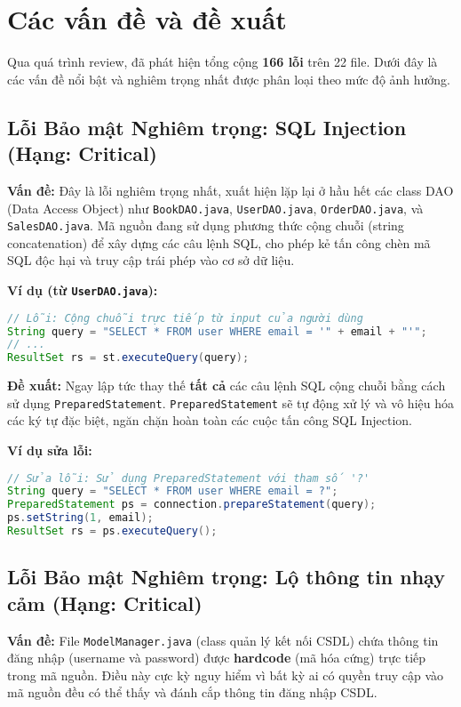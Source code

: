 \chapter{Các vấn đề và đề xuất}
Qua quá trình review, đã phát hiện tổng cộng \textbf{166 lỗi} trên 22 file. Dưới đây là các vấn đề nổi bật và nghiêm trọng nhất được phân loại theo mức độ ảnh hưởng.

\section{Lỗi Bảo mật Nghiêm trọng: SQL Injection (Hạng: Critical)}
\textbf{Vấn đề:} Đây là lỗi nghiêm trọng nhất, xuất hiện lặp lại ở hầu hết các class DAO (Data Access Object) như \texttt{BookDAO.java}, \texttt{UserDAO.java}, \texttt{OrderDAO.java}, và \texttt{SalesDAO.java}. Mã nguồn đang sử dụng phương thức cộng chuỗi (string concatenation) để xây dựng các câu lệnh SQL, cho phép kẻ tấn công chèn mã SQL độc hại và truy cập trái phép vào cơ sở dữ liệu.

\textbf{Ví dụ (từ \texttt{UserDAO.java}):}
\begin{lstlisting}[language=Java, caption={Lỗ hổng SQL Injection trong UserDAO.java (Line 25)}, firstnumber=25]
// Lỗi: Cộng chuỗi trực tiếp từ input của người dùng
String query = "SELECT * FROM user WHERE email = '" + email + "'";
// ...
ResultSet rs = st.executeQuery(query);
\end{lstlisting}

\textbf{Đề xuất:} Ngay lập tức thay thế \textbf{tất cả} các câu lệnh SQL cộng chuỗi bằng cách sử dụng \texttt{PreparedStatement}. \texttt{PreparedStatement} sẽ tự động xử lý và vô hiệu hóa các ký tự đặc biệt, ngăn chặn hoàn toàn các cuộc tấn công SQL Injection.

\textbf{Ví dụ sửa lỗi:}
\begin{lstlisting}[language=Java, caption={Sửa lỗi bằng PreparedStatement}]
// Sửa lỗi: Sử dụng PreparedStatement với tham số '?'
String query = "SELECT * FROM user WHERE email = ?";
PreparedStatement ps = connection.prepareStatement(query);
ps.setString(1, email);
ResultSet rs = ps.executeQuery();
\end{lstlisting}

\section{Lỗi Bảo mật Nghiêm trọng: Lộ thông tin nhạy cảm (Hạng: Critical)}
\textbf{Vấn đề:} File \texttt{ModelManager.java} (class quản lý kết nối CSDL) chứa thông tin đăng nhập (username và password) được \textbf{hardcode} (mã hóa cứng) trực tiếp trong mã nguồn. Điều này cực kỳ nguy hiểm vì bất kỳ ai có quyền truy cập vào mã nguồn đều có thể thấy và đánh cắp thông tin đăng nhập CSDL.

